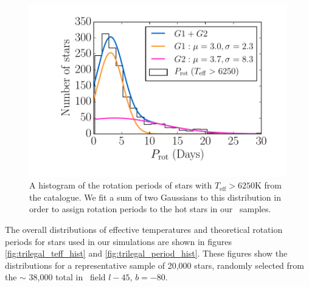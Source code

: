 \begin{figure}
\begin{center}
\includegraphics[width=6in, clip=true]{figures/hot_star_hist.pdf}
\caption[A histogram of the rotation periods of hot stars]
{A histogram of the rotation periods of stars with $T_{\mathrm{eff}} > 6250$K
from the \citet{Mcquillan2014} catalogue.
We fit a sum of two Gaussians to this distribution in order to assign rotation
periods to the hot stars in our \trilegal\ samples.}
\label{fig:hot_star_hist}
\end{center}
\end{figure}

The overall distributions of effective temperatures and theoretical rotation
periods for stars used in our simulations are shown in figures
\ref{fig:trilegal_teff_hist} and \ref{fig:trilegal_period_hist}.
These figures show the distributions for a representative sample of 20,000
stars, randomly selected from the $\sim$ 38,000 total in \trilegal\ field
$l-45$, $b=-80$.


